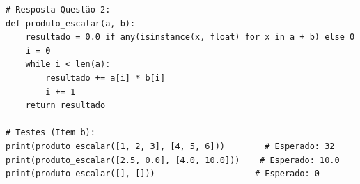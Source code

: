 \ifmostrarGabarito
\begin{verbatim}
# Resposta Questão 2:
def produto_escalar(a, b):
    resultado = 0.0 if any(isinstance(x, float) for x in a + b) else 0
    i = 0
    while i < len(a):
        resultado += a[i] * b[i]
        i += 1
    return resultado

# Testes (Item b):
print(produto_escalar([1, 2, 3], [4, 5, 6]))        # Esperado: 32
print(produto_escalar([2.5, 0.0], [4.0, 10.0]))    # Esperado: 10.0
print(produto_escalar([], []))                    # Esperado: 0
\end{verbatim}
\fi
